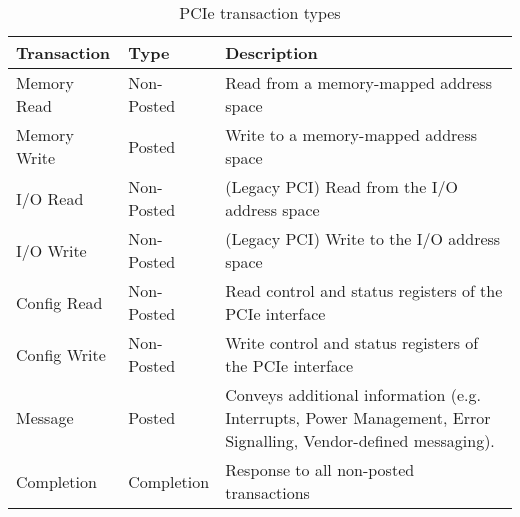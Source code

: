 \begin{table}[htb]
    \centering
    \begin{tabular}{|l|l|p{}|}
        \hline
        \textbf{Transaction} & \textbf{Type} & \textbf{Description} \\ 
        \hline
        Memory Read  & Non-Posted & Read from a memory-mapped address space \\ 
        Memory Write & Posted     & Write to a memory-mapped address space  \\ 
        I/O Read     & Non-Posted & (Legacy PCI) Read from the I/O address space \\ 
        I/O Write    & Non-Posted & (Legacy PCI) Write to the I/O address space \\ 
        Config Read  & Non-Posted & Read control and status registers of the PCIe interface \\ 
        Config Write & Non-Posted & Write control and status registers of the PCIe interface \\  
        Message      & Posted     & Conveys additional information (e.g. Interrupts, Power Management, Error Signalling, Vendor-defined messaging). \\
        Completion   & Completion & Response to all non-posted transactions \\ 
        \hline
    \end{tabular}
    \caption{PCIe transaction types}
    \label{tab:pcie-transaction-types}
\end{table}

\endinput




https://www.linkedin.com/pulse/pci-express-primer-3-transaction-layer-simon-southwell/